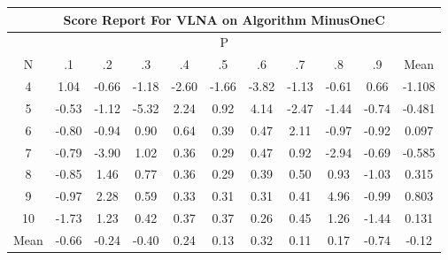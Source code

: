 \documentclass[11pt,a4paper]{report}
\begin{document}
\begin{longtable}{ | c || c | c | c | c | c | c | c | c | c || c |}
\hline
\multicolumn{11}{|c|}{ Score Report For VLNA on Algorithm MinusOneC} \\
\hline
\multicolumn{11}{|c|}{ P } \\
\hline
N & .1 & .2 & .3 & .4 & .5 & .6 & .7 & .8 & .9 & Mean\\
 \hline
 \hline
 \endhead
  4 &  \cellcolor[HTML]{E7E7FF} 1.04 &  \cellcolor[HTML]{FFEFEF} -0.66 &  \cellcolor[HTML]{FFDFDF} -1.18 &  \cellcolor[HTML]{FFBFBF} -2.60 &  \cellcolor[HTML]{FFD7D7} -1.66 &  \cellcolor[HTML]{FF9F9F} -3.82 &  \cellcolor[HTML]{FFDFDF} -1.13 &  \cellcolor[HTML]{FFEFEF} -0.61 &  \cellcolor[HTML]{EFEFFF} 0.66 & -1.108 \\
  5 &  \cellcolor[HTML]{FFEFEF} -0.53 &  \cellcolor[HTML]{FFDFDF} -1.12 &  \cellcolor[HTML]{FF7878} -5.32 &  \cellcolor[HTML]{C7C7FF} 2.24 &  \cellcolor[HTML]{E7E7FF} 0.92 &  \cellcolor[HTML]{9797FF} 4.14 &  \cellcolor[HTML]{FFBFBF} -2.47 &  \cellcolor[HTML]{FFD7D7} -1.44 &  \cellcolor[HTML]{FFEFEF} -0.74 & -0.481 \\
  6 &  \cellcolor[HTML]{FFE7E7} -0.80 &  \cellcolor[HTML]{FFE7E7} -0.94 &  \cellcolor[HTML]{E7E7FF} 0.90 &  \cellcolor[HTML]{EFEFFF} 0.64 &  \cellcolor[HTML]{F7F7FF} 0.39 &  \cellcolor[HTML]{F7F7FF} 0.47 &  \cellcolor[HTML]{C7C7FF} 2.11 &  \cellcolor[HTML]{FFE7E7} -0.97 &  \cellcolor[HTML]{FFE7E7} -0.92 & 0.097 \\
  7 &  \cellcolor[HTML]{FFEFEF} -0.79 &  \cellcolor[HTML]{FF9F9F} -3.90 &  \cellcolor[HTML]{E7E7FF} 1.02 &  \cellcolor[HTML]{F7F7FF} 0.36 &  \cellcolor[HTML]{F7F7FF} 0.29 &  \cellcolor[HTML]{F7F7FF} 0.47 &  \cellcolor[HTML]{E7E7FF} 0.92 &  \cellcolor[HTML]{FFB7B7} -2.94 &  \cellcolor[HTML]{FFEFEF} -0.69 & -0.585 \\
  8 &  \cellcolor[HTML]{FFE7E7} -0.85 &  \cellcolor[HTML]{D7D7FF} 1.46 &  \cellcolor[HTML]{EFEFFF} 0.77 &  \cellcolor[HTML]{F7F7FF} 0.36 &  \cellcolor[HTML]{F7F7FF} 0.29 &  \cellcolor[HTML]{F7F7FF} 0.39 &  \cellcolor[HTML]{EFEFFF} 0.50 &  \cellcolor[HTML]{E7E7FF} 0.93 &  \cellcolor[HTML]{FFE7E7} -1.03 & 0.315 \\
  9 &  \cellcolor[HTML]{FFE7E7} -0.97 &  \cellcolor[HTML]{C7C7FF} 2.28 &  \cellcolor[HTML]{EFEFFF} 0.59 &  \cellcolor[HTML]{F7F7FF} 0.33 &  \cellcolor[HTML]{F7F7FF} 0.31 &  \cellcolor[HTML]{F7F7FF} 0.31 &  \cellcolor[HTML]{F7F7FF} 0.41 &  \cellcolor[HTML]{8080FF} 4.96 &  \cellcolor[HTML]{FFE7E7} -0.99 & 0.803 \\
  10 &  \cellcolor[HTML]{FFD7D7} -1.73 &  \cellcolor[HTML]{DFDFFF} 1.23 &  \cellcolor[HTML]{F7F7FF} 0.42 &  \cellcolor[HTML]{F7F7FF} 0.37 &  \cellcolor[HTML]{F7F7FF} 0.37 &  \cellcolor[HTML]{F7F7FF} 0.26 &  \cellcolor[HTML]{F7F7FF} 0.45 &  \cellcolor[HTML]{DFDFFF} 1.26 &  \cellcolor[HTML]{FFD7D7} -1.44 & 0.131 \\
 \hline
 \hline
Mean &  \cellcolor[HTML]{FFEFEF} -0.66 &  \cellcolor[HTML]{FFF7F7} -0.24 &  \cellcolor[HTML]{FFF7F7} -0.40 &  \cellcolor[HTML]{F7F7FF} 0.24 &  \cellcolor[HTML]{FFFFFF} 0.13 &  \cellcolor[HTML]{F7F7FF} 0.32 &  \cellcolor[HTML]{FFFFFF} 0.11 &  \cellcolor[HTML]{F7F7FF} 0.17 &  \cellcolor[HTML]{FFEFEF} -0.74 &  \cellcolor[HTML]{FFFFFF} -0.12
\end{longtable}
\end{document}
